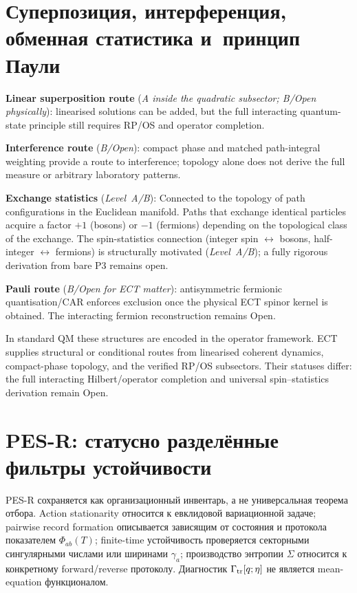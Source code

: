\documentclass[11pt,a4paper]{article}
\begin{document}
\section{Суперпозиция, интерференция, обменная статистика и~принцип Паули}

\textbf{Linear superposition route} (\emph{A inside the quadratic subsector; B/Open physically}): linearised solutions can be added, but the full interacting quantum-state principle still requires RP/OS and operator completion.

\textbf{Interference route} (\emph{B/Open}): compact phase and matched path-integral weighting provide a route to interference; topology alone does not derive the full measure or arbitrary laboratory patterns.

\textbf{Exchange statistics} (\emph{Level~A/B}): Connected to the topology of path configurations in the Euclidean manifold. Paths that exchange identical particles acquire a factor $+1$ (bosons) or $-1$ (fermions) depending on the topological class of the exchange. The spin-statistics connection (integer spin $\leftrightarrow$ bosons, half-integer $\leftrightarrow$ fermions) is structurally motivated (\emph{Level~A/B}); a fully rigorous derivation from bare P3 remains open.

\textbf{Pauli route} (\emph{B/Open for ECT matter}): antisymmetric fermionic quantisation/CAR enforces exclusion once the physical ECT spinor kernel is obtained. The interacting fermion reconstruction remains Open.

In standard QM these structures are encoded in the operator framework. ECT supplies structural or conditional routes from linearised coherent dynamics, compact-phase topology, and the verified RP/OS subsectors.  Their statuses differ: the full interacting Hilbert/operator completion and universal spin--statistics derivation remain Open.


\section{PES-R: статусно разделённые фильтры устойчивости}
\label{sec:pop_pes}

PES-R сохраняется как организационный инвентарь, а не универсальная теорема
отбора. Action stationarity относится к евклидовой вариационной задаче;
pairwise record formation описывается зависящим от состояния и протокола
показателем $\Phi_{ab}(T)$; finite-time устойчивость проверяется секторными
сингулярными числами или ширинами $\gamma_a$; производство энтропии $\Sigma$
относится к конкретному forward/reverse протоколу. Диагностик
$\Gamma_{\rm tr}[q;\eta]$ не является mean-equation функционалом.
\end{document}
